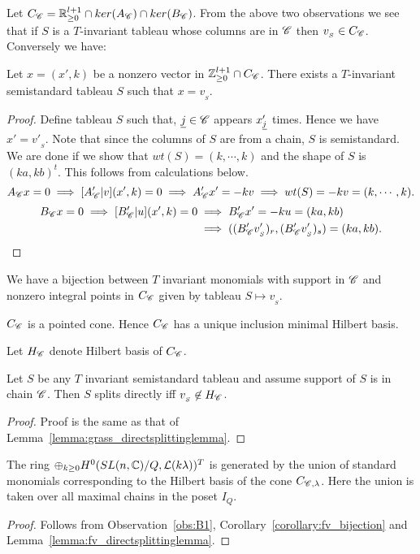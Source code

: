     Let \(C_{\mathscr{C}} = \mathbb{R}^{l+1}_{\ge 0} \cap ker(A_{\mathscr{C}}) \cap ker(B_{\mathscr{C}})\).
    From the above two observations we see that if \(S\) is a \(T\)-invariant tableau whose columns are in \(\mathscr{C}\) then \(v_{_S} \in C_{\mathscr{C}}\).
    Conversely we have: 
    \begin{observation}
        Let \(x=(x',k)\) be a nonzero vector in \(\mathbb{Z}_{\ge0}^{l+1}\cap C_{\mathscr{C}}\). There exists a \(T\)-invariant semistandard tableau \(S\) such that \(x=v_{_S}\).
    \end{observation}
    \begin{proof}
        Define tableau \(S\) such that, \(\underline{j} \in \mathscr{C}\) appears \(x'_{\underline{j}}\) times.
        Hence we have \(x' = v'_{_S}\).
        Note that since the columns of \(S\) are from a chain, \(S\) is semistandard.
        We are done if we show that \(wt(S) = (k,\cdots,k)\) and the
        shape of \(S\) is \((ka,kb)^t\).
        This follows from calculations below.
        \[
            A_{\mathscr{C}}x = 0
            \implies [A'_{\mathscr{C}}|v](x',k) = 0
            \implies A'_{\mathscr{C}}x' = -kv
            \implies wt(S) = -kv = (k,\cdots,k) .
        \]
        \begin{align*}
            B_{\mathscr{C}}x = 0
            \implies [B'_{\mathscr{C}}|u](x',k) = 0
            &\implies B'_{\mathscr{C}}x' = -ku = (ka,kb)\\
            &\implies (({B'_{\mathscr{C}}v'_{_S})_r},({B'_{\mathscr{C}}v'_{_S})_{s}}) = (ka,kb). 
        \end{align*}
    \end{proof}
\begin{corollary}
\label{corollary:fv_bijection}
We have a bijection between \(T\) invariant monomials with support in \(\mathscr{C}\) and nonzero integral points in \(C_{\mathscr{C}}\) given by tableau \(S \mapsto v_{_S}\). 
\end{corollary}
\begin{corollary}
\label{corollary:fv_pointedcone}
$C_{\mathscr{C}}$ is a pointed cone. Hence $C_{\mathscr{C}}$ has a unique inclusion minimal Hilbert basis.
\end{corollary}
Let \(H_{\mathscr{C}}\) denote Hilbert basis of \(C_{\mathscr{C}}\). 
\begin{lemma}
    \label{lemma:fv_directsplittinglemma}
    Let \(S\) be any \(T\) invariant semistandard tableau and assume support of $S$ is in chain $\mathscr{C}$. Then \(S\) splits directly iff \(v_{_S} \not\in H_{\mathscr{C}}\). 
\end{lemma}
\begin{proof} 
    Proof is the same as that of Lemma~\ref{lemma:grass_directsplittinglemma}.
\end{proof}
\begin{theorem}
   The ring $\oplus_{k\geq 0} H^0(SL(n,{\mathbb C})/Q, {\cal L}(k \lambda))^T$ is generated by the union of standard monomials corresponding to the Hilbert basis of the cone $C_{\mathscr{C}, \lambda}$. Here the union is taken over all maximal chains in the poset \(I_{Q}\).
\end{theorem}
\begin{proof}
    Follows from Observation~\ref{obs:B1}, Corollary~\ref{corollary:fv_bijection} and Lemma~\ref{lemma:fv_directsplittinglemma}.

\end{proof}
%
%

